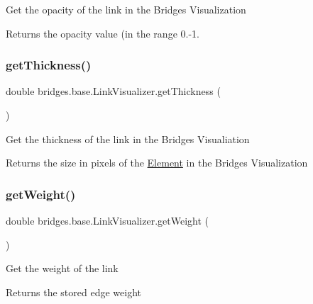 Get the opacity of the link in the Bridges Visualization

\begin{DoxyReturn}{Returns}
the opacity value (in the range 0.-\/1. 
\end{DoxyReturn}
\mbox{\label{classbridges_1_1base_1_1_link_visualizer_af1592d2a8664b00c1a51fdc0f8d1860a}} 
\subsubsection{\texorpdfstring{get\+Thickness()}{getThickness()}}
{\footnotesize\ttfamily double bridges.\+base.\+Link\+Visualizer.\+get\+Thickness (\begin{DoxyParamCaption}{ }\end{DoxyParamCaption})}

Get the thickness of the link in the Bridges Visualiation

\begin{DoxyReturn}{Returns}
the size in pixels of the \mbox{\hyperlink{classbridges_1_1base_1_1_element}{Element}} in the Bridges Visualization 
\end{DoxyReturn}
\mbox{\label{classbridges_1_1base_1_1_link_visualizer_ac96d7fb118ae6c7e1bdd57c5e2c8639a}} 
\subsubsection{\texorpdfstring{get\+Weight()}{getWeight()}}
{\footnotesize\ttfamily double bridges.\+base.\+Link\+Visualizer.\+get\+Weight (\begin{DoxyParamCaption}{ }\end{DoxyParamCaption})}

Get the weight of the link

\begin{DoxyReturn}{Returns}
the stored edge weight 
\end{DoxyReturn}
\mbox{\label{classbridges_1_1base_1_1_link_visualizer_a92f306dbd73b961befa8ab4c0620a89e}} 
